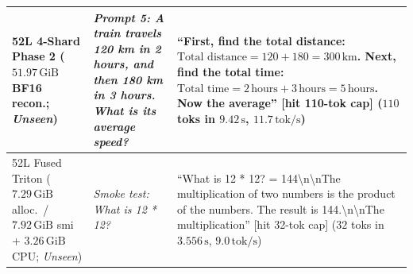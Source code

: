 \documentclass[10pt]{article} %
\begin{document}
\begin{table}[htbp]
\begin{center}
\begin{tabularx}{\linewidth}{>{\raggedright\arraybackslash}p{2.5cm} >{\raggedright\arraybackslash}p{2.8cm} >{\raggedright\arraybackslash}X}
\midrule
52L 4-Shard Phase 2 ($51.97\,\text{GiB}$ BF16 recon.; \emph{Unseen}) & \emph{Prompt 5: A train travels 120 km in 2 hours, and then 180 km in 3 hours. What is its average speed?} & ``First, find the total distance: $\text{Total distance} = 120 + 180 = 300\,\text{km}$. Next, find the total time: $\text{Total time} = 2\,\text{hours} + 3\,\text{hours} = 5\,\text{hours}$. Now the average'' [hit 110-tok cap] ($110$ toks in $9.42\,\text{s}$, $11.7\,\text{tok/s}$) \\
\midrule
52L Fused Triton ($7.29\,\text{GiB}$ alloc.\ / $7.92\,\text{GiB}$ smi + $3.26\,\text{GiB}$ CPU; \emph{Unseen}) & \emph{Smoke test: What is 12 * 12?} & ``What is 12 * 12? = 144\textbackslash n\textbackslash nThe multiplication of two numbers is the product of the numbers. The result is 144.\textbackslash n\textbackslash nThe multiplication'' [hit 32-tok cap] ($32$ toks in $3.556\,\text{s}$, $9.0\,\text{tok/s}$) \\
\bottomrule
\end{tabularx}
\end{center}
\end{table}
\end{document}
